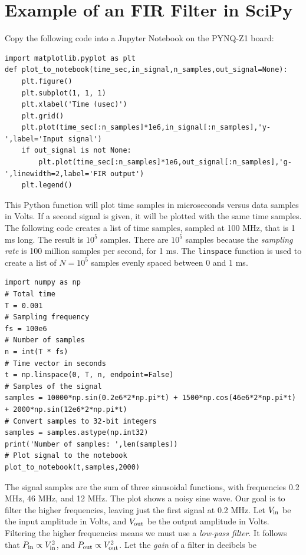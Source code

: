 \documentclass{article}
\begin{document}
\section{Example of an FIR Filter in SciPy}

Copy the following code into a Jupyter Notebook on the PYNQ-Z1 board:

\begin{verbatim}
import matplotlib.pyplot as plt
def plot_to_notebook(time_sec,in_signal,n_samples,out_signal=None):
    plt.figure()
    plt.subplot(1, 1, 1)
    plt.xlabel('Time (usec)')
    plt.grid()
    plt.plot(time_sec[:n_samples]*1e6,in_signal[:n_samples],'y-',label='Input signal')
    if out_signal is not None:
        plt.plot(time_sec[:n_samples]*1e6,out_signal[:n_samples],'g-',linewidth=2,label='FIR output')
    plt.legend()
\end{verbatim}

\noindent
This Python function will plot time samples in microseconds versus data samples in Volts.  If a second signal is given, it will be plotted with the same time samples.  The following code creates a list of time samples, sampled at 100 MHz, that is 1 ms long.  The result is $10^5$ samples.  There are $10^5$ samples because the \textit{sampling rate} is 100 million samples per second, for 1 ms.  The \verb+linspace+ function is used to create a list of $N = 10^5$ samples evenly spaced between 0 and 1 ms.

\begin{verbatim}
import numpy as np
# Total time
T = 0.001
# Sampling frequency
fs = 100e6
# Number of samples
n = int(T * fs)
# Time vector in seconds
t = np.linspace(0, T, n, endpoint=False)
# Samples of the signal
samples = 10000*np.sin(0.2e6*2*np.pi*t) + 1500*np.cos(46e6*2*np.pi*t) + 2000*np.sin(12e6*2*np.pi*t)
# Convert samples to 32-bit integers
samples = samples.astype(np.int32)
print('Number of samples: ',len(samples))
# Plot signal to the notebook
plot_to_notebook(t,samples,2000)
\end{verbatim}

\noindent
The signal samples are the sum of three sinusoidal functions, with frequencies 0.2 MHz, 46 MHz, and 12 MHz.  The plot shows a noisy sine wave.  Our goal is to filter the higher frequencies, leaving just the first signal at 0.2 MHz.  Let $V_{\rm in}$ be the input amplitude in Volts, and $V_{\rm out}$ be the output amplitude in Volts.  Filtering the higher frequencies means we must use a \textit{low-pass filter}.  It follows that $P_{\rm in} \propto V^2_{\rm in}$, and $P_{\rm out} \propto V^2_{\rm out}$.  Let the \textit{gain} of a filter in decibels be
\end{document}
